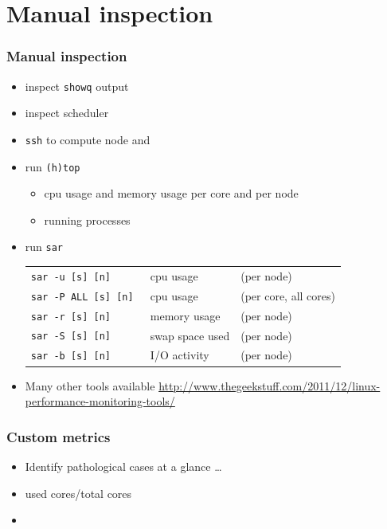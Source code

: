 \documentclass[aspectratio=1610]{beamer}
\begin{document}
\section{Manual inspection}
\begin{frame}
  \frametitle{Manual inspection}
  \begin{itemize}
    \item inspect \texttt{showq} output
    \item \alert{inspect scheduler}
    \item \texttt{ssh} to compute node and 
    \item run \texttt{(h)top}
    \begin{itemize}
      \item cpu usage and memory usage per core and per node
      \item running processes
    \end{itemize}
    \item run \texttt{sar}\\
    \begin{tabular}{l l l}
      \texttt{sar -u [s] [n] }     & cpu usage &(per node) \\
      \texttt{sar -P ALL [s] [n] } & cpu usage &(per core, all cores) \\
      \texttt{sar -r [s] [n] }     & memory usage &(per node) \\
      \texttt{sar -S [s] [n] }     & swap space used &(per node) \\
      \texttt{sar -b [s] [n] }     & I/O activity &(per node) 
    \end{tabular}
    \item Many other tools available \textcolor{vscBlueGreen}{
    \url{http://www.thegeekstuff.com/2011/12/linux-performance-monitoring-tools/}}
  \end{itemize}
\end{frame}

\begin{frame}
  \frametitle{Custom metrics}
  \begin{itemize}
    \item Identify pathological cases at a glance \ldots 
    \item used cores/total cores
    \item 
  \end{itemize}
\end{frame}
\end{document}
